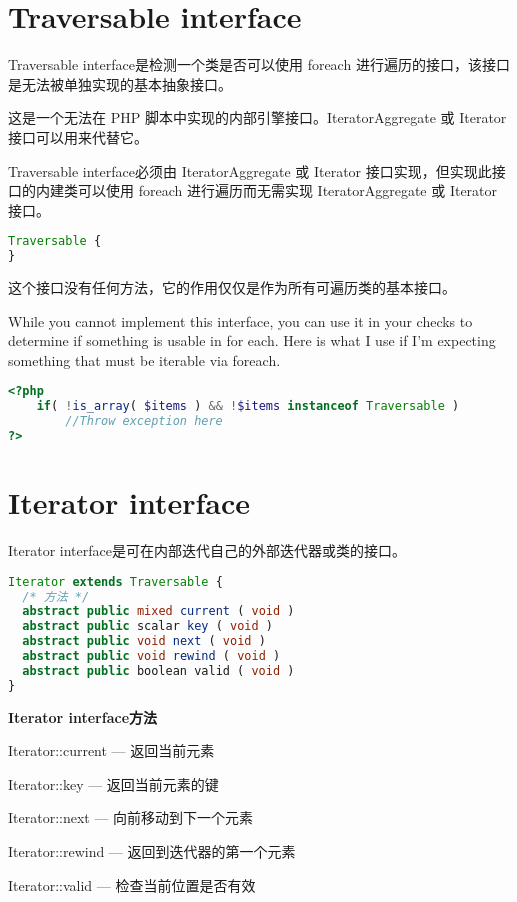 \section{Traversable interface}


Traversable interface是检测一个类是否可以使用 foreach 进行遍历的接口，该接口是无法被单独实现的基本抽象接口。

这是一个无法在 PHP 脚本中实现的内部引擎接口。IteratorAggregate 或 Iterator 接口可以用来代替它。


Traversable interface必须由 IteratorAggregate 或 Iterator 接口实现，但实现此接口的内建类可以使用 foreach 进行遍历而无需实现 IteratorAggregate 或 Iterator 接口。

\begin{lstlisting}[language=PHP]
Traversable {
}
\end{lstlisting}

这个接口没有任何方法，它的作用仅仅是作为所有可遍历类的基本接口。

While you cannot implement this interface, you can use it in your checks to determine if something is usable in for each. Here is what I use if I'm expecting something that must be iterable via foreach.




\begin{lstlisting}[language=PHP]
<?php
    if( !is_array( $items ) && !$items instanceof Traversable )
        //Throw exception here
?>
\end{lstlisting}


\section{Iterator interface}



Iterator interface是可在内部迭代自己的外部迭代器或类的接口。



\begin{lstlisting}[language=PHP]
Iterator extends Traversable {
  /* 方法 */
  abstract public mixed current ( void )
  abstract public scalar key ( void )
  abstract public void next ( void )
  abstract public void rewind ( void )
  abstract public boolean valid ( void )
}
\end{lstlisting}

\textbf{Iterator interface方法}

\begin{compactitem}
\item Iterator::current — 返回当前元素
\item Iterator::key — 返回当前元素的键
\item Iterator::next — 向前移动到下一个元素
\item Iterator::rewind — 返回到迭代器的第一个元素
\item Iterator::valid — 检查当前位置是否有效
\end{compactitem}

